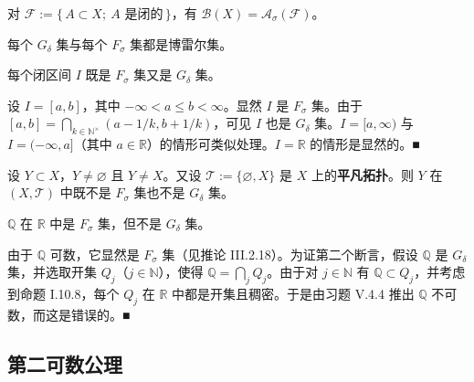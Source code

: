 \begin{example}

\begin{items}
\item

对 $ \mathcal{F} := \{\, A \subset X ;\ A \text{ 是闭的} \,\} $，有 $ \mathcal{B}(X) = \mathcal{A}_{\sigma}(\mathcal{F}) $。

\item

每个 $ G_{\delta} $ 集与每个 $ F_{\sigma} $ 集都是博雷尔集。

\item

每个闭区间 $ I $ 既是 $ F_{\sigma} $ 集又是 $ G_{\delta} $ 集。

\proofhead
设 $ I = [a, b] $，其中 $ -\infty < a \le b < \infty $。显然 $ I $ 是 $ F_{\sigma} $ 集。由于 $ [a, b] = \bigcap_{k \in \mathbb{N}^{\times}} (a - 1/k, b + 1/k) $，可见 $ I $ 也是 $ G_{\delta} $ 集。$ I = [a, \infty) $ 与 $ I = (-\infty, a] $（其中 $ a \in \mathbb{R} $）的情形可类似处理。$ I = \mathbb{R} $ 的情形是显然的。\nobreak\hspace{0.35em}■
\item

设 $ Y \subset X $，$ Y \ne \varnothing $ 且 $ Y \ne X $。又设 $ \mathcal{T} := \{\varnothing, X\} $ 是 $ X $ 上的\textbf{平凡拓扑}。则 $ Y $ 在 $ (X, \mathcal{T}) $ 中既不是 $ F_{\sigma} $ 集也不是 $ G_{\delta} $ 集。

\item

$ \mathbb{Q} $ 在 $ \mathbb{R} $ 中是 $ F_{\sigma} $ 集，但不是 $ G_{\delta} $ 集。

\proofhead
由于 $ \mathbb{Q} $ 可数，它显然是 $ F_{\sigma} $ 集（见推论 III.2.18）。为证第二个断言，假设 $ \mathbb{Q} $ 是 $ G_{\delta} $ 集，并选取开集 $ Q_{j} $（$ j \in \mathbb{N} $），使得 $ \mathbb{Q} = \bigcap_{j} Q_{j} $。由于对 $ j \in \mathbb{N} $ 有 $ \mathbb{Q} \subset Q_{j} $，并考虑到命题 I.10.8，每个 $ Q_{j} $ 在 $ \mathbb{R} $ 中都是开集且稠密。于是由习题 V.4.4 推出 $ \mathbb{Q} $ 不可数，而这是错误的。\nobreak\hspace{0.35em}■
\end{items}

\end{example}

\subsection*{第二可数公理}

